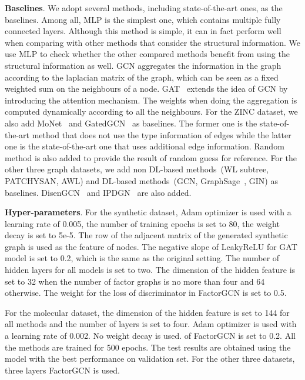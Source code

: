 \documentclass{article}
\begin{document}
\textbf{Baselines}. We adopt several methods, 
including state-of-the-art ones, as the baselines. 
Among all, 
MLP is the simplest one, which contains multiple fully connected layers.
Although this method is simple, it can in fact perform well when comparing
with other methods that consider the structural information.
We use MLP to check whether the other compared methods  benefit
from using the structural information as well.
GCN aggregates the information in the graph according to
the laplacian matrix of the graph,
which can be seen as a fixed weighted sum on  
the neighbours of a node. 
GAT~\citep{velickovic2018graphgat} extends the idea of GCN by 
introducing the attention mechanism.
The weights when doing the aggregation is computed dynamically according to
all the neighbours. For the ZINC dataset, we also add MoNet~\citep{monti2017geometricMoNet}
and GatedGCN~\citep{dwivedi2020benchmarkinggnn}
as  baselines. The former one is the state-of-the-art method that does not
use the type information of edges while the latter one is the state-of-the-art
one that uses additional edge information.
Random method is also added to provide the result of random guess for reference. For the other three graph datasets, we add
non DL-based methods~(WL subtree, PATCHYSAN, AWL) and 
DL-based methods~(GCN, GraphSage~\citep{hamilton2017inductive}, GIN)
as baselines. DisenGCN~\citep{ma2019disentangled} and 
IPDGN~\citep{liu2019independence}
are also added.

\textbf{Hyper-parameters}.
For the synthetic dataset, Adam optimizer is used with a
learning rate of 0.005, 
the number of training epochs is set to 80, 
the weight decay is set to 5e-5.
The row of the adjacent matrix of the generated synthetic 
graph is used as the feature of nodes. 
The negative slope of LeakyReLU for GAT model is set to 0.2, 
which is the same as the original setting. 
The number of hidden layers for all models is set to two. 
The dimension of the hidden feature is set to 32 when 
the number of factor graphs is no more than four
and 64 otherwise. 
The weight for the loss of discriminator in FactorGCN is set to 0.5.

For the molecular dataset, the dimension of the hidden feature is set to 144 
for all methods and the number of layers is set to four. 
Adam optimizer is used with a learning rate of 0.002. 
No weight decay is used. 
 of FactorGCN is set to 0.2. All the methods
are trained for 500 epochs. The test results are obtained using the model with 
the best performance on validation set. For the other three datasets,
three layers FactorGCN is used.
\end{document}
